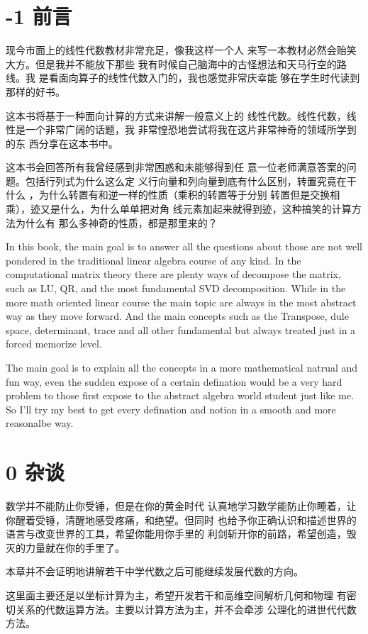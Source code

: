 \documentclass{book}
\newcommand{\prefacePara}
{
现今市面上的线性代数教材非常充足，像我这样一个人
来写一本教材必然会贻笑大方。但是我并不能放下那些
我有时候自己脑海中的古怪想法和天马行空的路线。我
是看面向算子的线性代数入门的，我也感觉非常庆幸能
够在学生时代读到那样的好书。

这本书将基于一种面向计算的方式来讲解一般意义上的
线性代数。线性代数，线性是一个非常广阔的话题，我
非常惶恐地尝试将我在这片非常神奇的领域所学到的东
西分享在这本书中。

这本书会回答所有我曾经感到非常困惑和未能够得到任
意一位老师满意答案的问题。包括行列式为什么这么定
义行向量和列向量到底有什么区别，转置究竟在干什么
，为什么转置有和逆一样的性质（乘积的转置等于分别
转置但是交换相乘），迹又是什么，为什么单单把对角
线元素加起来就得到迹，这种搞笑的计算方法为什么有
那么多神奇的性质，都是那里来的？

In this book, the main goal is to answer all the
questions about those are not well pondered in the
traditional linear algebra course of any kind.
In the computational matrix theory there are plenty
ways of decompose the matrix, such as LU, QR, and the
most fundamental SVD decomposition.
While in the more math oriented linear course
the main topic are always in the most abstract way
as they move forward.
And the main concepts such as the Transpose, dule
space, determinant, trace and all other fundamental
but always treated just in a forced memorize level.

The main goal is to explain all the concepts in a 
more mathematical natrual and fun way, even the sudden
expose of a certain defination would be a very hard
problem to those first expose to the abstract algebra
world student just like me. So I'll try my best to
get every defination and notion in a smooth and more
reasonalbe way. 
}
\begin{document}
\begin{CJK}{UTF8}{gbsn}
    \addtocounter{page}{2}

    \chapter{-1 前言}
    \prefacePara{}

    \setcounter{tocdepth}{3}
    \tableofcontents

    \mainmatter

    \chapter{0 杂谈}



    数学并不能防止你受锤，但是在你的黄金时代
    认真地学习数学能防止你睡着，让你醒着受锤，清醒地感受疼痛，和绝望。但同时
    也给予你正确认识和描述世界的语言与改变世界的工具，希望你能用你手里的
    利剑斩开你的前路，希望创造，毁灭的力量就在你的手里了。

    本章并不会证明地讲解若干中学代数之后可能继续发展代数的方向。

    这里面主要还是以坐标计算为主，希望开发若干和高维空间解析几何和物理
    有密切关系的代数运算方法。主要以计算方法为主，并不会牵涉
    公理化的进世代代数方法。


\end{CJK}
\end{document}
